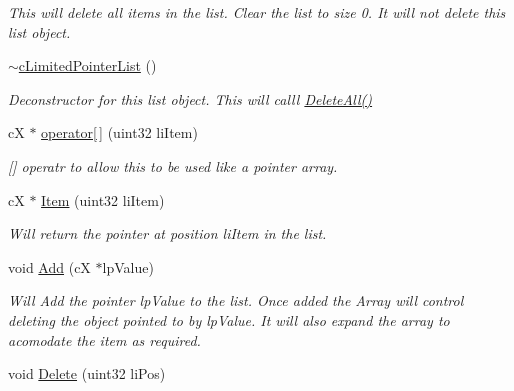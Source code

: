 \begin{DoxyCompactItemize}
\begin{DoxyCompactList}\small\item\em This will delete all items in the list. Clear the list to size 0. It will not delete this list object. \end{DoxyCompactList}\item 
\hypertarget{classc_limited_pointer_list_a4aef178a850d901cefc169cd0f8b1e71}{
\hyperlink{classc_limited_pointer_list_a4aef178a850d901cefc169cd0f8b1e71}{$\sim$cLimitedPointerList} ()}
\label{classc_limited_pointer_list_a4aef178a850d901cefc169cd0f8b1e71}

\begin{DoxyCompactList}\small\item\em Deconstructor for this list object. This will calll \hyperlink{classc_limited_pointer_list_a5cd2eaf04fa51a23e35bb78ba875501f}{DeleteAll()} \end{DoxyCompactList}\item 
\hypertarget{classc_limited_pointer_list_a118f2d5687c97cf122b163dbbdedb56d}{
cX $\ast$ \hyperlink{classc_limited_pointer_list_a118f2d5687c97cf122b163dbbdedb56d}{operator\mbox{[}$\,$\mbox{]}} (uint32 liItem)}
\label{classc_limited_pointer_list_a118f2d5687c97cf122b163dbbdedb56d}

\begin{DoxyCompactList}\small\item\em \mbox{[}\mbox{]} operatr to allow this to be used like a pointer array. \end{DoxyCompactList}\item 
\hypertarget{classc_limited_pointer_list_a00af27280f0a9d3f89fa8b9da36b7554}{
cX $\ast$ \hyperlink{classc_limited_pointer_list_a00af27280f0a9d3f89fa8b9da36b7554}{Item} (uint32 liItem)}
\label{classc_limited_pointer_list_a00af27280f0a9d3f89fa8b9da36b7554}

\begin{DoxyCompactList}\small\item\em Will return the pointer at position liItem in the list. \end{DoxyCompactList}\item 
\hypertarget{classc_limited_pointer_list_a0ba95ea83cbfee5957645c711ccab08c}{
void \hyperlink{classc_limited_pointer_list_a0ba95ea83cbfee5957645c711ccab08c}{Add} (cX $\ast$lpValue)}
\label{classc_limited_pointer_list_a0ba95ea83cbfee5957645c711ccab08c}

\begin{DoxyCompactList}\small\item\em Will Add the pointer lpValue to the list. Once added the Array will control deleting the object pointed to by lpValue. It will also expand the array to acomodate the item as required. \end{DoxyCompactList}\item 
\hypertarget{classc_limited_pointer_list_a7b6e333326d73cf1049b03a67cff1cbb}{
void \hyperlink{classc_limited_pointer_list_a7b6e333326d73cf1049b03a67cff1cbb}{Delete} (uint32 liPos)}
\label{classc_limited_pointer_list_a7b6e333326d73cf1049b03a67cff1cbb}


\end{DoxyCompactItemize}
